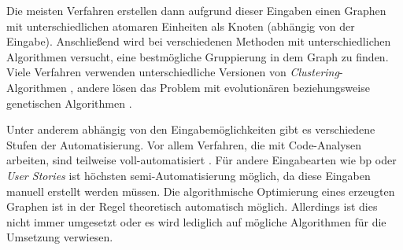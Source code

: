 Die meisten Verfahren erstellen dann aufgrund dieser Eingaben einen Graphen mit unterschiedlichen atomaren Einheiten als Knoten (abhängig von der Eingabe).
Anschließend wird bei verschiedenen Methoden mit unterschiedlichen Algorithmen versucht, eine bestmögliche Gruppierung in dem Graph zu finden.
Viele Verfahren verwenden unterschiedliche Versionen von \emph{Clustering}-Algorithmen \cite{arh-result-no-filter-3,arh-result-no-filter-5,arh-result-important-filter-4}, andere lösen das Problem mit evolutionären beziehungsweise genetischen Algorithmen \cite{arh-result-no-filter-2,arh-result-important-filter-7}.

Unter anderem abhängig von den Eingabemöglichkeiten gibt es verschiedene Stufen der Au\-to\-ma\-ti\-sie\-rung.
Vor allem Verfahren, die mit Code-Analysen arbeiten, sind teilweise voll-automatisiert \cite{Fil2023}.
Für andere Eingabearten wie \acrfull{bp} oder \emph{User Stories} ist höchsten semi-Automatisierung möglich, da diese Eingaben manuell erstellt werden müssen.
Die algorithmische Optimierung eines erzeugten Graphen ist in der Regel theoretisch automatisch möglich.
Allerdings ist dies nicht immer umgesetzt oder es wird lediglich auf mögliche Algorithmen für die Umsetzung verwiesen.




